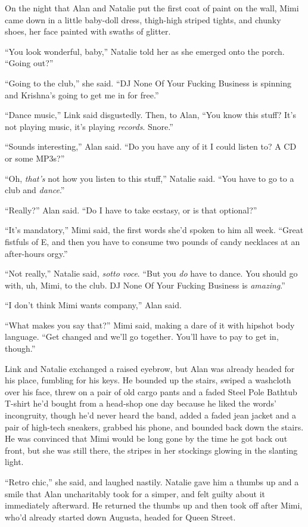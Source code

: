On the night that Alan and Natalie put the first coat of paint on the
wall, Mimi came down in a little baby-doll dress, thigh-high striped
tights, and chunky shoes, her face painted with swaths of glitter.

``You look wonderful, baby,'' Natalie told her as she emerged onto the
porch.  ``Going out?''

``Going to the club,'' she said.  ``DJ None Of Your Fucking Business
is spinning and Krishna's going to get me in for free.''

``Dance music,'' Link said disgustedly.  Then, to Alan, ``You know
this stuff?  It's not playing music, it's playing \textit{records}. 
Snore.''

``Sounds interesting,'' Alan said.  ``Do you have any of it I could
listen to?  A CD or some MP3s?''

``Oh, \textit{that's} not how you listen to this stuff,'' Natalie
said.  ``You have to go to a club and \textit{dance}.''

``Really?'' Alan said.  ``Do I have to take ecstasy, or is that
optional?''

``It's mandatory,'' Mimi said, the first words she'd spoken to him all
week.  ``Great fistfuls of E, and then you have to consume two pounds
of candy necklaces at an after-hours orgy.''

``Not really,'' Natalie said, \textit{sotto voce}.  ``But you
\textit{do} have to dance.  You should go with, uh, Mimi, to the club. 
DJ None Of Your Fucking Business is \textit{amazing}.''

``I don't think Mimi wants company,'' Alan said.

``What makes you say that?'' Mimi said, making a dare of it with
hipshot body language.  ``Get changed and we'll go together.  You'll
have to pay to get in, though.''

Link and Natalie exchanged a raised eyebrow, but Alan was already
headed for his place, fumbling for his keys.  He bounded up the
stairs, swiped a washcloth over his face, threw on a pair of old cargo
pants and a faded Steel Pole Bathtub T-shirt he'd bought from a
head-shop one day because he liked the words' incongruity, though he'd
never heard the band, added a faded jean jacket and a pair of
high-tech sneakers, grabbed his phone, and bounded back down the
stairs.  He was convinced that Mimi would be long gone by the time he
got back out front, but she was still there, the stripes in her
stockings glowing in the slanting light.

``Retro chic,'' she said, and laughed nastily.  Natalie gave him a
thumbs up and a smile that Alan uncharitably took for a simper, and
felt guilty about it immediately afterward.  He returned the thumbs up
and then took off after Mimi, who'd already started down Augusta,
headed for Queen Street.

